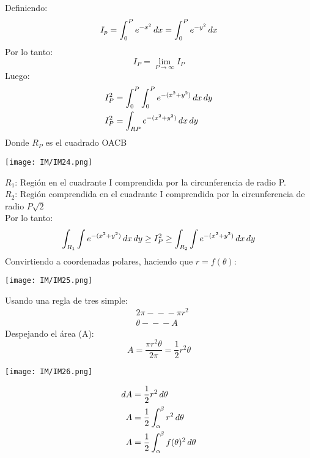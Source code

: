 \documentclass[
	12pt, %
	fleqn, %
	a4paper, %
	oneside, %
]{LegrandOrangeBook}
\begin{document}
\begin{theorem}[Demostrar $\int_0^{\infty}e^{-u^2}\diff u=\frac{\sqrt{\pi}}{2}$]
Definiendo:
\begin{displaymath}
I_p=\int_0^Pe^{-x^2}\mathop{}\!d x=\int_0^Pe^{-y^2}\mathop{}\!d x
\end{displaymath}
Por lo tanto:
\begin{displaymath}
I_P=\lim_{P\to\infty}I_P
\end{displaymath}
Luego:
\begin{align*}
I_P^2&=\int_0^P\int_0^Pe^{-(x^2+y^2)}\mathop{}\!d x\mathop{}\!d y\\
I_P^2&=\int_{RP}e^{-(x^2+y^2)}\mathop{}\!d x\mathop{}\!d y
\end{align*}
Donde $R_P$ es el cuadrado OACB
\begin{center}
\texttt{[image: IM/IM24.png]}
\end{center}
$R_1$: Región en el cuadrante I comprendida por la circunferencia de radio P.\\
$R_2$: Región comprendida en el cuadrante I comprendida por la circunferencia de radio $P\sqrt{2}$\\
Por lo tanto:
\begin{displaymath}
\int_{R_1}\int e^{-(x^2+y^2)}\mathop{}\!d x\mathop{}\!d y\geq I_P^2 \geq \int_{R_2}\int e^{-(x^2+y^2)}\mathop{}\!d x\mathop{}\!d y
\end{displaymath}
Convirtiendo a coordenadas polares, haciendo que $r=f(\theta)$:
\begin{center}
\texttt{[image: IM/IM25.png]}
\end{center}
Usando una regla de tres simple:
\begin{align*}
& 2\pi -\!\!\!-\!\!\!- \pi r^2\\
& \theta -\!\!\!-\!\!\!- A
\end{align*}
Despejando el área (A):
\begin{displaymath}
A=\frac{\pi r^2\theta}{2\pi}=\frac{1}{2}r^2\theta
\end{displaymath}
\begin{center}
\texttt{[image: IM/IM26.png]}
\end{center}
\begin{align*}
\mathop{}\!d A&=\frac{1}{2}r^2\mathop{}\!d\theta\\
A&=\frac{1}{2}\int_{\alpha}^{\beta}r^2\mathop{}\!d\theta\\
A&=\frac{1}{2}\int_{\alpha}^{\beta}f(\theta)^2\mathop{}\!d\theta
\end{align*}
\begin{center}

\end{center}
\end{theorem}
\end{document}
